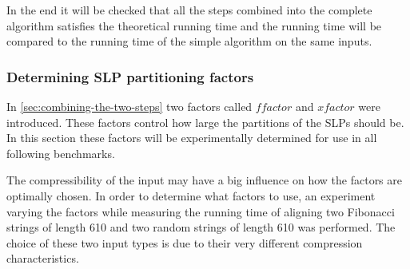 \documentclass[twoside,11pt,openright]{report}
\newcommand{\xfactor}{\ensuremath{\mathit{xfactor}}}
\newcommand{\ffactor}{\ensuremath{\mathit{ffactor}}}
\begin{document}
In the end it will be checked that all the steps combined into the complete algorithm satisfies the theoretical running time and the running time will be compared to the running time of the simple algorithm on the same inputs.

\subsubsection{Determining SLP partitioning factors}
\label{sec:benchmark:slp-partition-factors}
In \cref{sec:combining-the-two-steps} two factors called $\ffactor$ and $\xfactor$ were introduced. These factors control how large the partitions of the SLPs should be. In this section these factors will be experimentally determined for use in all following benchmarks.

The compressibility of the input may have a big influence on how the factors are optimally chosen. In order to determine what factors to use, an experiment varying the factors while measuring the running time of aligning two Fibonacci strings of length 610 and two random strings of length 610 was performed. The choice of these two input types is due to their very different compression characteristics.
\end{document}
